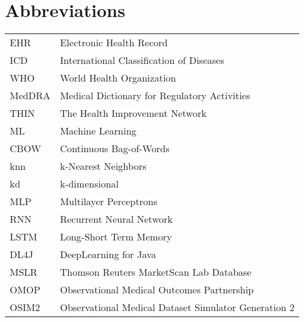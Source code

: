 \documentclass[master=ecws,masteroption=ai]{kulemt}
\begin{document}
\section*{Abbreviations}
\begin{flushleft}
  \renewcommand{\arraystretch}{1.1}
  \begin{tabularx}{\textwidth}{@{}p{12mm}X@{}}
    EHR   & Electronic Health Record \\
    ICD   & International Classification of Diseases \\
    WHO  & World Health Organization \\
    MedDRA & Medical Dictionary for Regulatory Activities \\
    THIN & The Health Improvement Network \\
    ML & Machine Learning \\
    CBOW & Continuous Bag-of-Words \\
    knn & k-Nearest Neighbors \\
    kd & k-dimensional \\
    MLP & Multilayer Perceptrons \\
    RNN & Recurrent Neural Network \\
    LSTM & Long-Short Term Memory \\
    DL4J & DeepLearning for Java \\
    MSLR & Thomson Reuters MarketScan Lab Database \\
    OMOP & Observational Medical Outcomes Partnership \\
    OSIM2 & Observational Medical Dataset Simulator Generation 2 \\
  \end{tabularx}
\end{flushleft}


\mainmatter








%
%


\backmatter
\nocite{*}


\end{document}
